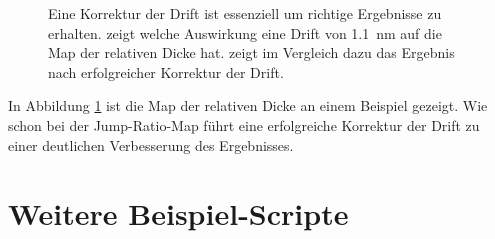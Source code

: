\documentclass[
	paper=a4,				%
	twoside=true,			%
	BCOR=6mm,				%
	fontsize=12pt,			%
	pagesize=auto,			%
	numbers=noenddot,		%
	bibliography=totoc,		%
	draft=false
]{scrartcl}
\begin{document}
\begin{figure}
	\centering
	\qquad
	\caption[Eine Korrektur der Drift ist essenziell um richtige Ergebnisse bei der Bestimmung der relativen Dicke zu erhalten.]{Eine Korrektur der Drift ist essenziell um richtige Ergebnisse zu erhalten.  zeigt welche Auswirkung eine Drift von \SI{1,1}{nm} auf die Map der relativen Dicke hat.  zeigt im Vergleich dazu das Ergebnis nach erfolgreicher Korrektur der Drift.}
	\label{fig:rel-Dicke}
\end{figure}

In Abbildung \ref{fig:rel-Dicke} ist die Map der relativen Dicke an einem Beispiel gezeigt. Wie schon bei der Jump-Ratio-Map führt eine erfolgreiche Korrektur der Drift zu einer deutlichen Verbesserung des Ergebnisses.

\section{Weitere Beispiel-Scripte}
\end{document}
